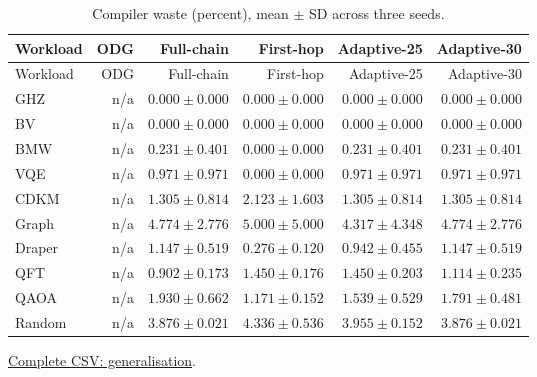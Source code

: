 \begin{center}\small
\begin{longtable}{lrrrrr}
\caption{Compiler waste (percent), mean $\pm$ SD across three seeds.}\\
\toprule
Workload & ODG & Full-chain & First-hop & Adaptive-25 & Adaptive-30 \\
\midrule\endfirsthead
\toprule
Workload & ODG & Full-chain & First-hop & Adaptive-25 & Adaptive-30 \\
\midrule\endhead
GHZ & n/a & $0.000 \pm 0.000$ & $0.000 \pm 0.000$ & $0.000 \pm 0.000$ & $0.000 \pm 0.000$ \\
BV & n/a & $0.000 \pm 0.000$ & $0.000 \pm 0.000$ & $0.000 \pm 0.000$ & $0.000 \pm 0.000$ \\
BMW & n/a & $0.231 \pm 0.401$ & $0.000 \pm 0.000$ & $0.231 \pm 0.401$ & $0.231 \pm 0.401$ \\
VQE & n/a & $0.971 \pm 0.971$ & $0.000 \pm 0.000$ & $0.971 \pm 0.971$ & $0.971 \pm 0.971$ \\
CDKM & n/a & $1.305 \pm 0.814$ & $2.123 \pm 1.603$ & $1.305 \pm 0.814$ & $1.305 \pm 0.814$ \\
Graph & n/a & $4.774 \pm 2.776$ & $5.000 \pm 5.000$ & $4.317 \pm 4.348$ & $4.774 \pm 2.776$ \\
Draper & n/a & $1.147 \pm 0.519$ & $0.276 \pm 0.120$ & $0.942 \pm 0.455$ & $1.147 \pm 0.519$ \\
QFT & n/a & $0.902 \pm 0.173$ & $1.450 \pm 0.176$ & $1.450 \pm 0.203$ & $1.114 \pm 0.235$ \\
QAOA & n/a & $1.930 \pm 0.662$ & $1.171 \pm 0.152$ & $1.539 \pm 0.529$ & $1.791 \pm 0.481$ \\
Random & n/a & $3.876 \pm 0.021$ & $4.336 \pm 0.536$ & $3.955 \pm 0.152$ & $3.876 \pm 0.021$ \\
\bottomrule\end{longtable}\end{center}
{\footnotesize \href{https://github.com/sanjeevkrishnaa/Compiler-Driven-ACE/blob/codex/ace-scheduler-correctness/docs/latex/oct25_pre_golden/data/generalisation.csv}{Complete CSV: generalisation}. }
